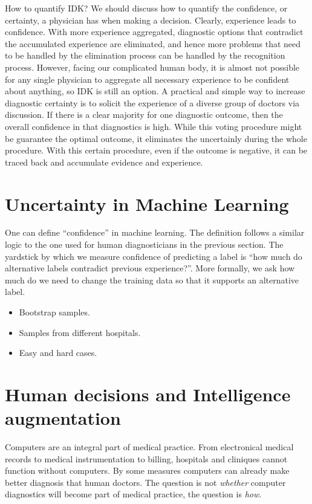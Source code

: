 \documentclass[11pt]{article}
\begin{document}
  How to quantify IDK? We should discuss how to quantify the
  confidence, or certainty, a physician has when making a
  decision. Clearly, experience leads to confidence. With more
  experience aggregated, diagnostic options that contradict the
  accumulated experience are eliminated, and hence more problems that
  need to be handled by the elimination process can be handled by the
  recognition process. However, facing our complicated human body, it
  is almost not possible for any single physician to aggregate all
  necessary experience to be confident about anything, so IDK is still
  an option. A practical and simple way to increase diagnostic
  certainty is to solicit the experience of a diverse group of doctors
  via discussion. If there is a clear majority for one diagnostic
  outcome, then the overall confidence in that diagnostics is
  high. While this voting procedure might be guarantee the optimal
  outcome, it eliminates the uncertainly during the whole
  procedure. With this certain procedure, even if the outcome is
  negative, it can be traced back and accumulate evidence and
  experience.
%


    
\section*{Uncertainty in Machine Learning}

One can define ``confidence'' in machine learning. The definition follows a
similar logic to the one used for human diagnosticians in the previous
section. The yardstick by which we measure confidence of predicting a
label is ``how much do alternative labels contradict previous
experience?''.
More formally, we ask how much do we need to change the training data
so that it supports an alternative label.

\begin{itemize}
  \item Bootstrap samples.
  \item Samples from different hospitals.
  \item Easy and hard cases.
  \end{itemize}

  \section*{Human decisions and Intelligence augmentation}

  Computers are an integral part of medical practice. From
  electronical medical records to medical instrumentation to billing,
  hospitals and cliniques cannot function without computers. By some
  measures computers can already make better diagnosis that human
  doctors. The question is not {\em whether} computer diagnostics will
  become part of medical practice, the question is {\em how}.
\end{document}
